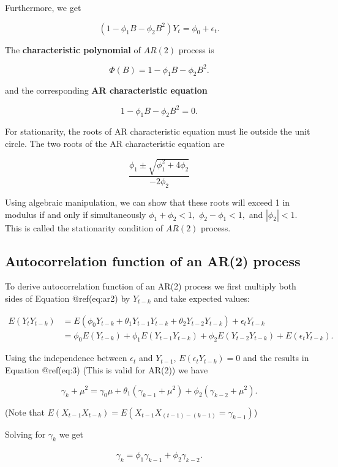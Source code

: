 \documentclass[
  11pt,
  a4paper,
]{report}
\begin{document}
Furthermore, we get

\[(1-\phi_1 B - \phi_2 B^2) Y_t = \phi_0 + \epsilon_t.\]

The \textbf{characteristic polynomial} of \(AR(2)\) process is

\[\Phi(B)=1-\phi_1 B - \phi_2 B^2.\]

and the corresponding \textbf{AR characteristic equation}

\[1-\phi_1 B - \phi_2 B^2=0.\]

For stationarity, the roots of AR characteristic equation must lie
outside the unit circle. The two roots of the AR characteristic equation
are

\[\frac{\phi_1 \pm \sqrt{\phi_1^2 + 4\phi_2}}{-2\phi_2}\]

Using algebraic manipulation, we can show that these roots will exceed 1
in modulus if and only if simultaneously \(\phi_1 + \phi_2 < 1,\)
\(\phi_2-\phi_1 < 1,\) and \(|\phi_2| < 1.\) This is called the
stationarity condition of \(AR(2)\) process.

\subsection{Autocorrelation function of an AR(2)
process}\label{autocorrelation-function-of-an-ar2-process}

To derive autocorrelation function of an AR(2) process we first multiply
both sides of Equation @ref(eq:ar2) by \(Y_{t-k}\) and take expected
values:

\begin{align}
E(Y_tY_{t-k}) &= E(\phi_0Y_{t-k}+\theta_1Y_{t-1}Y_{t-k}+\theta_2Y_{t-2}Y_{t-k})+\epsilon_tY_{t-k} \\
&= \phi_0 E(Y_{t-k})+\phi_{1}E(Y_{t-1}Y_{t-k}) + \phi_2 E(Y_{t-2} Y_{t-k}) + E(\epsilon_tY_{t-k}).
\end{align}

Using the independence between \(\epsilon_t\) and \(Y_{t-1}\),
\(E(\epsilon_t Y_{t-k})=0\) and the results in Equation @ref(eq:3) (This
is valid for AR(2)) we have

\[\gamma_k + \mu^2 = \gamma_0 \mu + \theta_1 (\gamma_{k-1}+\mu^2)+\phi_2 (\gamma_{k-2}+\mu^2).\]

(Note that \(E(X_{t-1}X_{t-k})=E(X_{t-1}X_{(t-1)-(k-1)}=\gamma_{k-1})\))

Solving for \(\gamma_k\) we get

\begin{align}
 \gamma_k=\phi_1\gamma_{k-1}+\phi_2\gamma_{k-2}.
\end{align}
\end{document}
